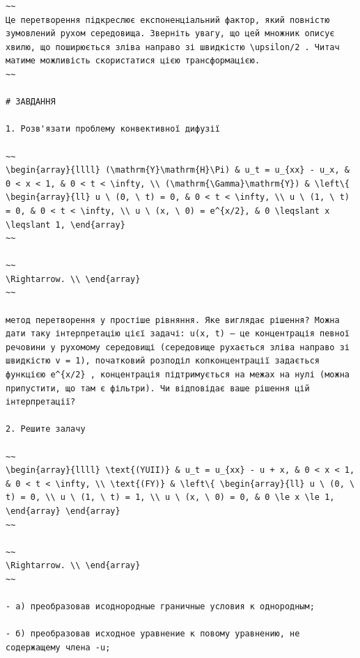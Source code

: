 \documentclass[
  ukrainian,
]{article}
\begin{document}
\begin{verbatim}
~~
Це перетворення підкреслює експоненціальний фактор, який повністю зумовлений рухом середовища. Зверніть увагу, що цей множник описує хвилю, що поширюється зліва направо зі швидкістю \upsilon/2 . Читач матиме можливість скористатися цією трансформацією.
~~

# ЗАВДАННЯ

1. Розв'язати проблему конвективної дифузії

~~
\begin{array}{llll} (\mathrm{Y}\mathrm{H}\Pi) & u_t = u_{xx} - u_x, & 0 < x < 1, & 0 < t < \infty, \\ (\mathrm{\Gamma}\mathrm{Y}) & \left\{ \begin{array}{ll} u \ (0, \ t) = 0, & 0 < t < \infty, \\ u \ (1, \ t) = 0, & 0 < t < \infty, \\ u \ (x, \ 0) = e^{x/2}, & 0 \leqslant x \leqslant 1, \end{array}
~~

~~
\Rightarrow. \\ \end{array}
~~

метод перетворення у простіше рівняння. Яке виглядає рішення? Можна дати таку інтерпретацію цієї задачі: u(x, t) — це концентрація певної речовини у рухомому середовищі (середовище рухається зліва направо зі швидкістю v = 1), початковий розподіл копконцентрації задається функцією e^{x/2} , концентрація підтримується на межах на нулі (можна припустити, що там є фільтри). Чи відповідає ваше рішення цій інтерпретації?

2. Решите залачу

~~
\begin{array}{llll} \text{(YUII)} & u_t = u_{xx} - u + x, & 0 < x < 1, & 0 < t < \infty, \\ \text{(FY)} & \left\{ \begin{array}{ll} u \ (0, \ t) = 0, \\ u \ (1, \ t) = 1, \\ u \ (x, \ 0) = 0, & 0 \le x \le 1, \end{array} \end{array}
~~

~~
\Rightarrow. \\ \end{array}
~~

- а) преобразовав исоднородные граничные условия к однородным;

- б) преобразовав исходное уравнение к повому уравнению, не содержащему члена -u;


\end{verbatim}
\end{document}
